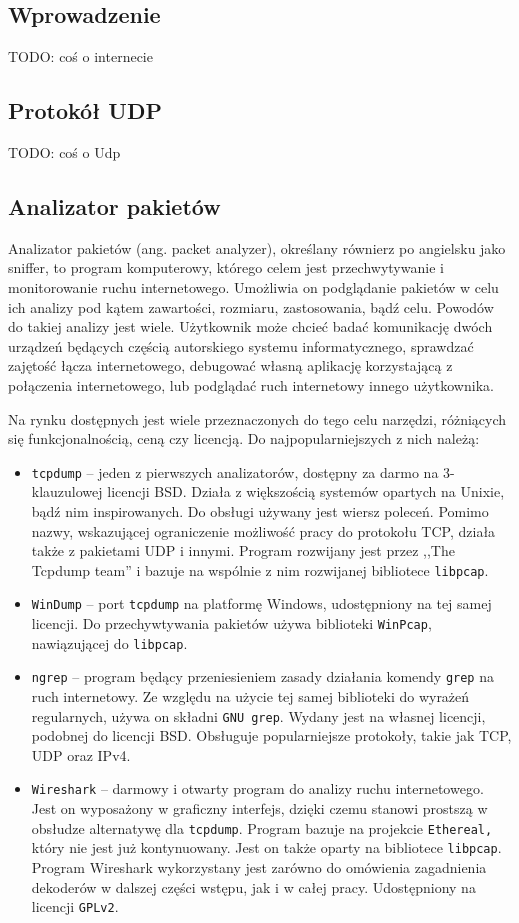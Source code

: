 \documentclass[a4paper, 12pt, twoside, openright]{article}
\begin{document}
	\subsection{Wprowadzenie}
	TODO: coś o internecie
	\subsection{Protokół UDP}
	TODO: coś o Udp
	\subsection{Analizator pakietów}
	\indent\par
	Analizator pakietów (ang. packet analyzer), określany równierz po angielsku jako sniffer, to program komputerowy, którego celem jest przechwytywanie
	i monitorowanie ruchu internetowego. Umożliwia on
	podglądanie pakietów w celu ich analizy pod kątem zawartości, rozmiaru, zastosowania, bądź celu. Powodów do takiej
	analizy jest wiele. Użytkownik może chcieć badać komunikację dwóch urządzeń będących częścią autorskiego systemu
	informatycznego, sprawdzać zajętość łącza internetowego, debugować własną aplikację korzystającą z połączenia internetowego,
	lub podglądać ruch internetowy innego użytkownika.

	Na rynku dostępnych jest wiele przeznaczonych do tego celu narzędzi, różniących się funkcjonalnością, ceną czy licencją.
	Do najpopularniejszych z nich należą:
	\begin{itemize}
		\item \texttt{tcpdump} -- jeden z pierwszych analizatorów, dostępny za darmo na 3-klauzulowej licencji BSD. Działa
			z większością systemów opartych na Unixie, bądź nim inspirowanych. Do obsługi używany jest wiersz poleceń.
			Pomimo nazwy, wskazującej ograniczenie możliwość pracy do protokołu TCP, działa także z pakietami UDP i innymi.
			Program rozwijany jest przez ,,The Tcpdump team'' i bazuje na wspólnie z nim rozwijanej bibliotece \texttt{libpcap}.
		\item \texttt{WinDump} -- port \texttt{tcpdump} na platformę Windows, udostępniony na tej samej licencji. Do przechywtywania
			pakietów używa biblioteki \texttt{WinPcap}, nawiązującej do \texttt{libpcap}.
		\item \texttt{ngrep} -- program będący przeniesieniem zasady działania komendy \texttt{grep} na ruch internetowy.
			Ze względu na użycie tej samej biblioteki do wyrażeń regularnych, używa on składni \texttt{GNU grep}.
			Wydany jest na własnej licencji, podobnej do licencji BSD. Obsługuje popularniejsze protokoły, takie jak TCP, UDP oraz IPv4.
		\item \texttt{Wireshark} -- darmowy i otwarty program do analizy ruchu internetowego. Jest on wyposażony w graficzny
			interfejs, dzięki czemu stanowi prostszą w obsłudze alternatywę dla \texttt{tcpdump}. Program bazuje na projekcie
			\texttt{Ethereal,} który nie jest już kontynuowany. Jest on także oparty na bibliotece
			\texttt{libpcap}. Program Wireshark wykorzystany jest zarówno
			do omówienia zagadnienia dekoderów w dalszej części wstępu, jak i w całej pracy. Udostępniony na licencji \texttt{GPLv2}.
	\end{itemize}
\end{document}
